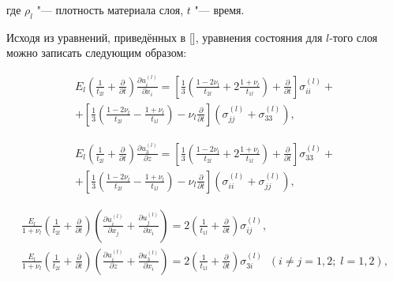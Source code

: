 где $\rho _l$ "--- плотность материала слоя, $t$ "--- время.



Исходя из уравнений, приведённых в [], уравнения состояния для $l$-того слоя можно записать следующим образом:

\begin{multline*}

E_l \left(\frac{1}{t_{2l}} +\frac{\partial }{\partial t} \right)

\frac{\partial u_i^{(l)}}{\partial x_i} =\left[\frac{1}{3} \left(\frac{1-2\nu _l}{t_{2l}} +

2\frac{1+\nu _l}{t_{1l}} \right)+\frac{\partial }{\partial t} \right]\sigma _{ii}^{(l)} + \\

+\left[\frac{1}{3} \left(\frac{1-2\nu _{l}}{t_{2l}} -\frac{1+\nu _{l}}{t_{1l}} \right)-\nu _l \frac{\partial }{\partial t} \right]

(\sigma _{jj}^{(l)} +\sigma _{33}^{(l)}),

\end{multline*}

\begin{multline}

\label{anofr:eq_4}

E_l \left(\frac{1}{t_{2l}} +\frac{\partial }{\partial t} \right)

\frac{\partial u_3^{(l)}}{\partial z} =\left[\frac{1}{3} \left(\frac{1-2\nu _l}{t_{2l}} +

2\frac{1+\nu _l}{t_{1l}} \right)+\frac{\partial }{\partial t} \right]\sigma _{33}^{(l)} + \\

+\left[\frac{1}{3} \left(\frac{1-2\nu _l}{t_{2l}} -\frac{1+\nu _l}{t_{1l}} \right)-\nu _l

\frac{\partial }{\partial t} \right](\sigma _{ii}^{(l)} +\sigma _{jj}^{(l)} ),

\end{multline}

\begin{gather*}

\frac{E_l}{1+\nu _l} \left(\frac{1}{t_{2l}} +\frac{\partial }{\partial t} \right)

\left(\frac{\partial u_i^{(l)} }{\partial x_j} +\frac{\partial u_j^{(l)}}{\partial x_i} \right)=

2\left(\frac{1}{t_{1l} } +\frac{\partial }{\partial t} \right)\sigma _{ij}^{(l)},  \\

\frac{E_l}{1+\nu _l} \left(\frac{1}{t_{2l}} +\frac{\partial }{\partial t} \right)\left(\frac{\partial u_i^{(l)} }{\partial z}

+\frac{\partial u_3^{(l)} }{\partial x_i} \right)=2\left(\frac{1}{t_{1l} } +\frac{\partial }{\partial t} \right)\sigma _{3i}^{(l)} \; \;

(i\ne j=1, 2;\; l=1, 2),

\end{gather*}

